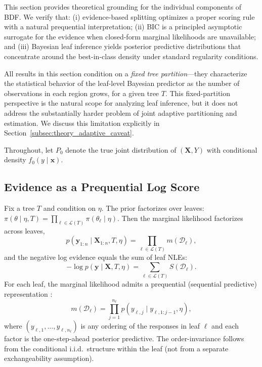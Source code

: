 \documentclass[twoside,11pt]{article}
\begin{document}
This section provides theoretical grounding for the individual components of BDF. We verify that: (i) evidence-based splitting optimizes a proper scoring rule with a natural prequential interpretation; (ii) BIC is a principled asymptotic surrogate for the evidence when closed-form marginal likelihoods are unavailable; and (iii) Bayesian leaf inference yields posterior predictive distributions that concentrate around the best-in-class density under standard regularity conditions.

All results in this section condition on a \emph{fixed tree partition}---they characterize the statistical behavior of the leaf-level Bayesian predictor as the number of observations in each region grows, for a given tree $T$. This fixed-partition perspective is the natural scope for analyzing leaf inference, but it does not address the substantially harder problem of joint adaptive partitioning and estimation. We discuss this limitation explicitly in Section~\ref{subsec:theory_adaptive_caveat}.

Throughout, let $P_0$ denote the true joint distribution of $(\mathbf{X},Y)$ with conditional density $f_0(y\mid \mathbf{x})$.


\subsection{Evidence as a Prequential Log Score}\label{subsec:theory_prequential}

Fix a tree $T$ and condition on $\eta$. The prior factorizes over leaves:
$\pi(\theta\mid \eta, T)=\prod_{\ell\in\mathcal{L}(T)}\pi(\theta_\ell\mid\eta)$.
Then the marginal likelihood factorizes across leaves,
\[
p(\mathbf{y}_{1:n}\mid \mathbf{X}_{1:n},T,\eta)
=
\prod_{\ell\in\mathcal{L}(T)} m(\mathcal{D}_\ell),
\]
and the negative log evidence equals the sum of leaf NLEs:
\begin{equation}\label{eq:global_nle_sum}
-\log p(\mathbf{y}\mid\mathbf{X},T,\eta)
=
\sum_{\ell\in\mathcal{L}(T)} S(\mathcal{D}_\ell).
\end{equation}
For each leaf, the marginal likelihood admits a prequential (sequential predictive) representation \citep{dawid1984present}:
\[
m(\mathcal{D}_\ell)
=
\prod_{j=1}^{n_\ell} p(y_{\ell,j}\mid y_{\ell,1:j-1}, \eta),
\]
where $(y_{\ell,1},\dots,y_{\ell,n_\ell})$ is any ordering of the responses in leaf $\ell$ and each factor is the one-step-ahead posterior predictive. The order-invariance follows from the conditional i.i.d.\ structure within the leaf (not from a separate exchangeability assumption).
\end{document}
